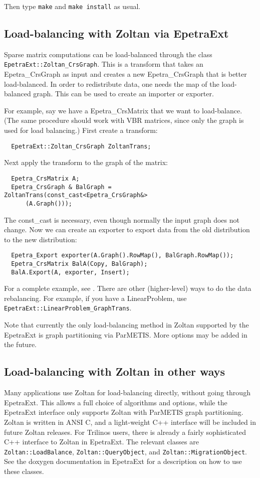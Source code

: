 Then type \verb!make! and \verb!make install! as usual.

\subsection{Load-balancing with Zoltan via EpetraExt}
Sparse matrix computations can be load-balanced through
the class \\
\verb!EpetraExt::Zoltan_CrsGraph!. This is
a transform that takes an Epetra\_CrsGraph as input
and creates a new Epetra\_CrsGraph that is better load-balanced.
In order to redistribute data, one needs the map of the load-balanced
graph. This can be used to create an importer or exporter. 

For example, say we have a Epetra\_CrsMatrix that we want to load-balance.
(The same procedure should work with VBR matrices, since only the graph 
is used for load balancing.)
First create a transform:
\begin{verbatim}
  EpetraExt::Zoltan_CrsGraph ZoltanTrans;
\end{verbatim}
Next apply the transform to the graph of the matrix:
\begin{verbatim}
  Epetra_CrsMatrix A;
  Epetra_CrsGraph & BalGraph = ZoltanTrans(const_cast<Epetra_CrsGraph&>
      (A.Graph()));
\end{verbatim}
The const\_cast is necessary, even though normally the input graph does not 
change.
Now we can create an exporter to export data from the old distribution 
to the new distribution:
\begin{verbatim}
  Epetra_Export exporter(A.Graph().RowMap(), BalGraph.RowMap());
  Epetra_CrsMatrix BalA(Copy, BalGraph);
  BalA.Export(A, exporter, Insert);
\end{verbatim}

For a complete example, see .
There are other (higher-level) ways to do the data rebalancing. For example,
if you have a LinearProblem, use \verb!EpetraExt::LinearProblem_GraphTrans!.

Note that currently the only load-balancing method in Zoltan supported
by the EpetraExt is graph partitioning via ParMETIS. More
options may be added in the future.

\subsection{Load-balancing with Zoltan in other ways}

Many applications use Zoltan for load-balancing directly, without
going through EpetraExt. This allows a full choice of algorithms
and options, while the EpetraExt interface only supports
Zoltan with ParMETIS graph partitioning. Zoltan is written in ANSI C,
and a light-weight C++ interface will be included in future Zoltan
releases.  For Trilinos users, there is already a fairly sophisticated
C++ interface to Zoltan in EpetraExt. The relevant classes
are \verb!Zoltan::LoadBalance!, \verb!Zoltan::QueryObject!,
and \verb!Zoltan::MigrationObject!. See the doxygen documentation 
in EpetraExt for a description on how to use these classes.


